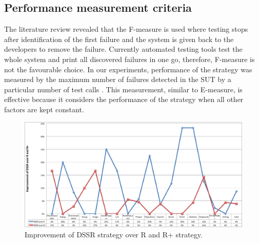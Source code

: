 \documentclass[conference]{IEEEtran}
\begin{document}


\subsection{Performance measurement criteria}
The literature review revealed that the F-measure is used where testing stops after identification of the first failure and the system is given back to the developers to remove the failure. Currently automated testing tools test the whole system and print all discovered failures in one go, therefore, F-measure is not the favourable choice. In our experiments, performance of the strategy was measured by the maximum number of failures detected in the SUT by a particular number of test calls \cite{Pacheco2007a, Ciupa2007}. This measurement, similar to E-measure, is effective because it considers the performance of the strategy when all other factors are kept constant.

\begin{figure}[ht]
\centering
\includegraphics[width=17cm]{DssrImprove.png}
\caption{Improvement of DSSR strategy over R and R+ strategy.}
\label{fig:LineChart}
\end{figure}
\end{document}
